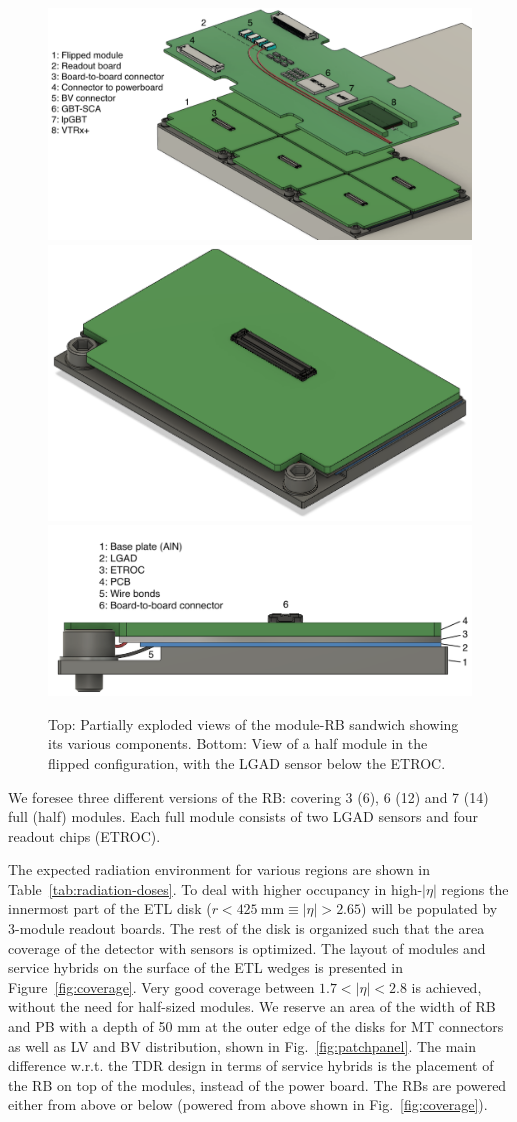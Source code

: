 \documentclass[11pt]{article}
\begin{document}
\begin{figure}[!ht]
\centering
\includegraphics[width=0.90 \textwidth]{figures/ETL_exploded_legend.pdf}
\includegraphics[width=0.40 \textwidth]{figures/Flipped_module_3D_v2.png}
\includegraphics[width=0.55 \textwidth]{figures/Flipped_module_legend_v2.png}
\caption{
Top: Partially exploded views of the module-RB sandwich showing its various components.
Bottom: View of a half module in the flipped configuration, with the LGAD sensor below the ETROC.
}
\label{fig:flippedModule}
\end{figure}

We foresee three different versions of the RB: covering 3 (6), 6 (12) and 7 (14) full (half) modules.
Each full module consists of two LGAD sensors and four readout chips (ETROC).

The expected radiation environment for various regions are shown in Table~\ref{tab:radiation-doses}.
To deal with higher occupancy in high-$|\eta|$ regions the innermost part of the ETL disk ($r<425~\mathrm{mm} \equiv |\eta|>2.65$) will be populated by 3-module readout boards.
The rest of the disk is organized such that the area coverage of the detector with sensors is optimized.
The layout of modules and service hybrids on the surface of the ETL wedges is presented in Figure~\ref{fig:coverage}.
Very good coverage between $1.7<|\eta|<2.8$ is achieved, without the need for half-sized modules.
We reserve an area of the width of RB and PB with a depth of 50 mm at the outer edge of the disks for MT connectors as well as LV and BV distribution, shown in Fig.~\ref{fig:patchpanel}.
The main difference w.r.t. the TDR design in terms of service hybrids is the placement of the RB on top of the modules, instead of the power board.
The RBs are powered either from above or below (powered from above shown in Fig.~\ref{fig:coverage}).
\end{document}
